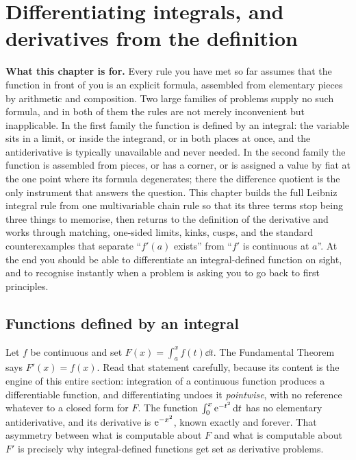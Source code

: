 \chapter{Differentiating integrals, and derivatives from the definition}

\begin{orient}
\textbf{What this chapter is for.} Every rule you have met so far assumes that the function in front of you is an explicit formula, assembled from elementary pieces by arithmetic and composition. Two large families of problems supply no such formula, and in both of them the rules are not merely inconvenient but inapplicable. In the first family the function is defined by an integral: the variable sits in a limit, or inside the integrand, or in both places at once, and the antiderivative is typically unavailable and never needed. In the second family the function is assembled from pieces, or has a corner, or is assigned a value by fiat at the one point where its formula degenerates; there the difference quotient is the only instrument that answers the question. This chapter builds the full Leibniz integral rule from one multivariable chain rule so that its three terms stop being three things to memorise, then returns to the definition of the derivative and works through matching, one-sided limits, kinks, cusps, and the standard counterexamples that separate ``$f'(a)$ exists'' from ``$f'$ is continuous at $a$''. At the end you should be able to differentiate an integral-defined function on sight, and to recognise instantly when a problem is asking you to go back to first principles.
\end{orient}

\section{Functions defined by an integral}

Let $f$ be continuous and set $F(x)=\int_{a}^{x}f(t)\dd t$. The Fundamental Theorem says $F'(x)=f(x)$. Read that statement carefully, because its content is the engine of this entire section: integration of a continuous function produces a differentiable function, and differentiating undoes it \emph{pointwise}, with no reference whatever to a closed form for $F$. The function $\int_{0}^{x}\mathrm{e}^{-t^{2}}\,\mathrm{d} t$ has no elementary antiderivative, and its derivative is $\mathrm{e}^{-x^{2}}$, known exactly and forever. That asymmetry between what is computable about $F$ and what is computable about $F'$ is precisely why integral-defined functions get set as derivative problems.

